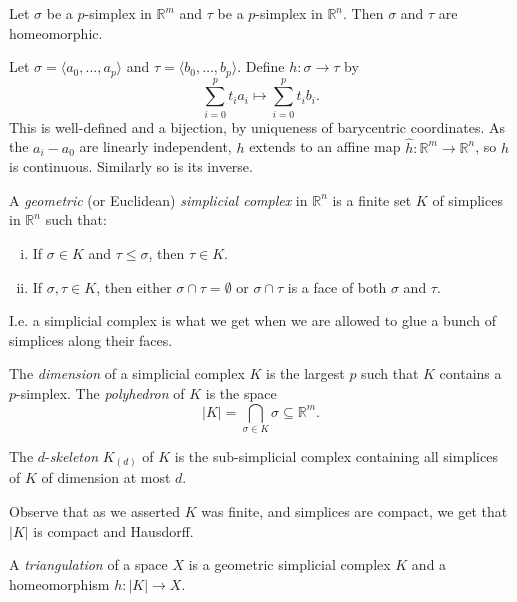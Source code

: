 \documentclass[12pt]{article}
\begin{document}
\begin{lemma}
	Let $\sigma$ be a $p$-simplex in $\mathbb{R}^m$ and $\tau$ be a $p$-simplex in $\mathbb{R}^n$. Then $\sigma$ and $\tau$ are homeomorphic.
\end{lemma}

\begin{proofbox}
	Let $\sigma = \langle a_0, \ldots, a_p \rangle$ and $\tau = \langle b_0, \ldots, b_p \rangle$. Define $h : \sigma \to \tau$ by
	\[
	\sum_{i = 0}^p t_i a_i \mapsto \sum_{i = 0}^p t_i b_i.
	\]
	This is well-defined and a bijection, by uniqueness of barycentric coordinates. As the $a_i - a_0$ are linearly independent, $h$ extends to an affine map $\hat h : \mathbb{R}^m \to \mathbb{R}^n$, so $h$ is continuous. Similarly so is its inverse.
\end{proofbox}

\begin{definition}
	A \emph{geometric} (or Euclidean) \emph{simplicial complex} in $\mathbb{R}^n$ is a finite set $K$ of simplices in $\mathbb{R}^n$ such that:
	\begin{enumerate}[(i)]
		\item If $\sigma \in K$ and $\tau \leq \sigma$, then $\tau \in K$.
		\item If $\sigma, \tau \in K$, then either $\sigma \cap \tau = \emptyset$ or $\sigma \cap \tau$ is a face of both $\sigma$ and $\tau$.
	\end{enumerate}
\end{definition}

I.e. a simplicial complex is what we get when we are allowed to glue a bunch of simplices along their faces.

The \emph{dimension} of a simplicial complex $K$ is the largest $p$ such that $K$ contains a $p$-simplex. The \emph{polyhedron} of $K$ is the space
\[
|K| = \bigcap_{\sigma \in K}\sigma \subseteq \mathbb{R}^m.
\]

The $d$-\emph{skeleton} $K_{(d)}$ of $K$ is the sub-simplicial complex containing all simplices of $K$ of dimension at most $d$.

Observe that as we asserted $K$ was finite, and simplices are compact, we get that $|K|$ is compact and Hausdorff.

\begin{definition}
	A \emph{triangulation} of a space $X$ is a geometric simplicial complex $K$ and a homeomorphism $h : |K| \to X$.
\end{definition}
\end{document}

